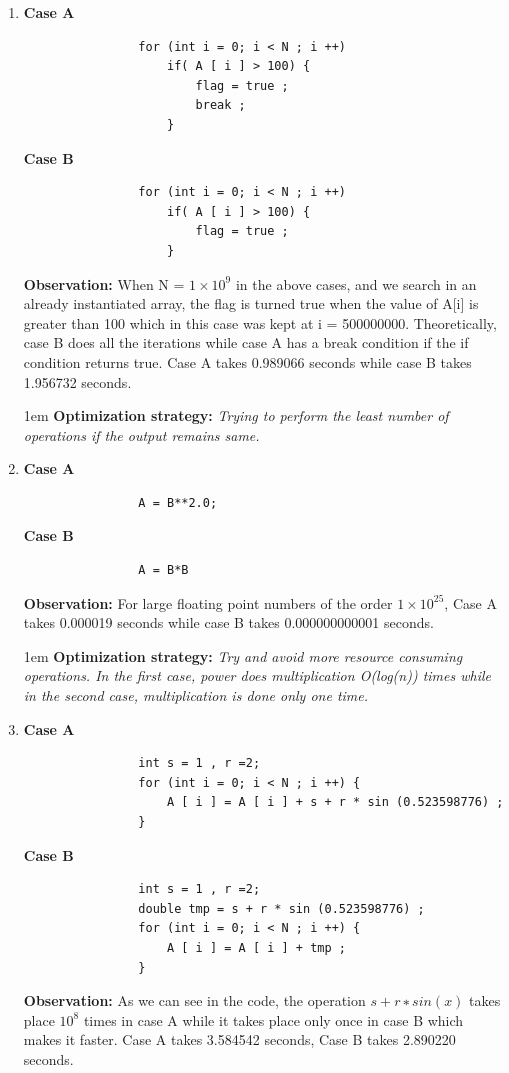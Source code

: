 \documentclass[12,a4paper]{article}
\begin{document}
    \begin{enumerate}
        \item \textbf{Case A}
            \begin{lstlisting}
                for (int i = 0; i < N ; i ++)
                    if( A [ i ] > 100) {
                        flag = true ;
                        break ;
                    }
            \end{lstlisting}
            \textbf{Case B}
            \begin{lstlisting}
                for (int i = 0; i < N ; i ++)
                    if( A [ i ] > 100) {
                        flag = true ;
                    }
            \end{lstlisting}
        \textbf{Observation:} When N = $1 \times 10^9$ in the above cases, and we search in an already instantiated array, the flag is turned true when the value of A[i] is greater than 100 which in this case was kept at i = 500000000. Theoretically, case B does all the iterations while case A has a break condition if the if condition returns true. Case A takes 0.989066 seconds while case B takes 1.956732 seconds.
        
        \parskip 1em
        \textbf{Optimization strategy:} \emph{Trying to perform the least number of operations if the output remains same.}
        \newpage
        \item \textbf{Case A}
            \begin{lstlisting}
                A = B**2.0;
            \end{lstlisting}
            \textbf{Case B}
            \begin{lstlisting}
                A = B*B
            \end{lstlisting}
        \textbf{Observation:} For large floating point numbers of the order $1 \times 10^{25}$, Case A takes 0.000019 seconds while case B takes 0.000000000001 seconds.
        
        \parskip 1em
        \textbf{Optimization strategy:} \emph{Try and avoid more resource consuming operations. In the first case, power does multiplication O(log(n)) times while in the second case, multiplication is done only one time.}
      \item \textbf{Case A}
            \begin{lstlisting}
                int s = 1 , r =2;
                for (int i = 0; i < N ; i ++) {
                    A [ i ] = A [ i ] + s + r * sin (0.523598776) ;
                }
            \end{lstlisting}
            \textbf{Case B}
            \begin{lstlisting}
                int s = 1 , r =2;
                double tmp = s + r * sin (0.523598776) ;
                for (int i = 0; i < N ; i ++) {
                    A [ i ] = A [ i ] + tmp ;
                }
            \end{lstlisting}
        \textbf{Observation:} As we can see in the code, the operation $s + r ∗ sin(x)$ takes place $10^8$ times in case A while it takes place only once in case B which makes it faster. Case A takes 3.584542 seconds, Case B takes 2.890220 seconds.
        

\end{enumerate}
\end{document}
